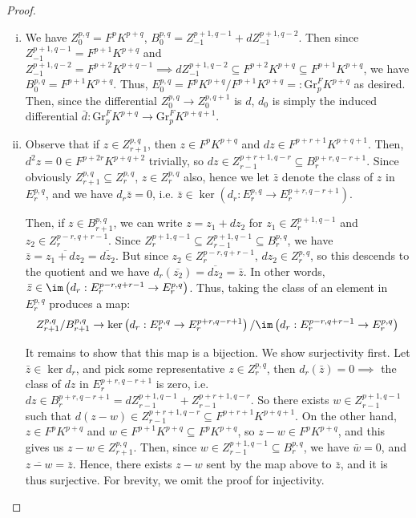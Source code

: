 \begin{proof}
    \begin{enumerate}[i.]
        \item We have $Z_0^{p,q} = F^pK^{p+q}$, $B_0^{p,q} = Z^{p+1,q-1}_{-1} + dZ^{p+1,q-2}_{-1}$. Then since $Z^{p+1,q-1}_{-1} = F^{p+1}K^{p+q}$ and $Z^{p+1,q-2}_{-1} = F^{p+2}K^{p+q-1} \implies dZ^{p+1,q-2}_{-1}\subseteq F^{p+2}K^{p+q} \subseteq F^{p+1}K^{p+q}$, we have $B_0^{p,q} =  F^{p+1}K^{p+q}$. Thus, $E_0^{p,q} = F^pK^{p+q}/F^{p+1}K^{p+q}=: \mathrm{Gr}_p^F K^{p+q}$ as desired. Then, since the differential $Z_0^{p,q}\to Z_0^{p,q+1}$ is $d$, $d_0$ is simply the induced differential $\bar{d}:\mathrm{Gr}_p^FK^{p+q}\to \mathrm{Gr}_p^F K^{p+q+1}$.  

        \item Observe that if $z\in Z_{r+1}^{p,q}$, then $z\in F^p K^{p+q}$ and $dz\in F^{p+r+1}K^{p+q+1}$. Then, $d^2z = 0\in F^{p+2r}K^{p+q+2}$ trivially, so $dz\in Z_{r-1}^{p+r+1,q-r} \subseteq B_r^{p+r, q-r+1}$. Since obviously $Z_{r+1}^{p,q}\subseteq Z_r^{p,q}$, $z\in Z_r^{p,q}$ also, hence we let $\bar z$ denote the class of $z$ in $E_r^{p,q}$, and we have $d_r\bar z = 0$, i.e. $\bar z\in \ker \left(d_r:E_r^{p,q} \to E_r^{p+r,q-r+1}\right)$. 

        \medskip
        
        Then, if $z \in B_{r+1}^{p,q}$, we can write $z=z_1+dz_2$ for $z_1 \in Z_r^{p+1,q-1}$ and $z_2\in Z_r^{p-r,q+r-1}$. Since $Z_r^{p+1,q-1}\subseteq Z_{r-1}^{p+1,q-1}\subseteq B_r^{p,q}$, we have $\bar{z} = \overline{z_1+dz_2} = \overline{dz_2}$. But since $z_2\in Z_r^{p-r,q+r-1}$, $dz_2 \in Z_r^{p,q}$, so this descends to the quotient and we have $d_r\left(\overline{z_2}\right) = \overline{dz_2} =\bar z$. In other words, $\bar z \in \im\left(d_r:E_r^{p-r,q+r-1} \to E_r^{p,q}\right)$. Thus, taking the class of an element in $E_r^{p,q}$ produces a map:
        $$
        Z_{r+1}^{p,q}/B_{r+1}^{p,q} \to \ker \left(d_r:E_r^{p,q} \to E_r^{p+r,q-r+1}\right) / \im\left(d_r:E_r^{p-r,q+r-1} \to E_r^{p,q}\right)
        $$
        
        It remains to show that this map is a bijection. We show surjectivity first. Let $\bar z \in \ker d_r$, and pick some representative $z\in Z_r^{p,q}$, then $d_r(\bar z) = 0 \implies$ the class of $dz$ in $E_r^{p+r,q-r+1}$ is zero, i.e. $dz \in B_r^{p+r,q-r+1} = dZ_{r-1}^{p+1,q-1} +Z_{r-1}^{p+r+1,q-r}$. So there exists $w\in Z_{r-1}^{p+1,q-1}$ such that $d(z-w) \in Z_{r-1}^{p+r+1,q-r}\subseteq F^{p+r+1}K^{p+q+1}$. On the other hand, $z\in F^pK^{p+q}$ and $w\in F^{p+1}K^{p+q} \subseteq F^pK^{p+q}$, so $z-w\in F^pK^{p+q}$, and this gives us $z-w\in Z_{r+1}^{p,q}$. Then, since $w\in Z_{r-1}^{p+1,q-1}\subseteq B_r^{p,q}$, we have $\bar w=0$, and $\overline{z-w} = \bar z$. Hence, there exists $z-w$ sent by the map above to $\bar z$, and it is thus surjective. For brevity, we omit the proof for injectivity. 


\end{enumerate}
\end{proof}
